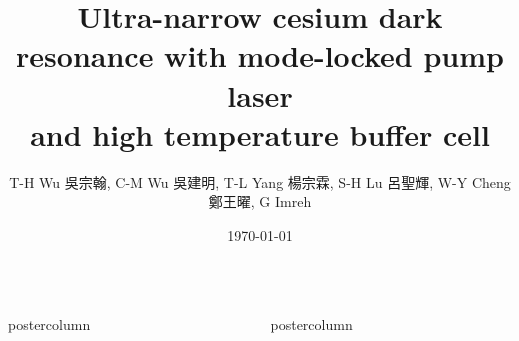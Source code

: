 \documentclass[final,CJKutf8,hyperref={pdfpagelabels=false,unicode}]{beamer}
\title{\huge Ultra-narrow cesium dark resonance with mode-locked pump laser\\ and high temperature buffer cell}
\author{\begin{TChinese}T-H Wu 吳宗翰, C-M Wu 吳建明, T-L Yang 楊宗霖, S-H Lu 呂聖輝, W-Y Cheng 鄭王曜, G Imreh\end{TChinese}}
\institute[IAMS, Academia Sinica]{Institute of Atomic and Molecular Sciences, Academia Sinica, Taiwan}
\date{\today}
\newlength{\columnheight}
\begin{document}
\begin{frame}

  \begin{columns}
    \begin{column}{.49\textwidth}
      \begin{beamercolorbox}[center,wd=\textwidth]{postercolumn}
        \begin{minipage}[T]{.95\textwidth}
          \parbox[t][\columnheight]{\textwidth}{

            


            \vfill
            

            \vfill
            

          }
        \end{minipage}
      \end{beamercolorbox}
    \end{column}
    \begin{column}{.49\textwidth}
      \begin{beamercolorbox}[center,wd=\textwidth]{postercolumn}
        \begin{minipage}[T]{.95\textwidth}
          \parbox[t][\columnheight]{\textwidth}{

            

            \vfill
            

            \vfill
            
          }
        \end{minipage}
      \end{beamercolorbox}
    \end{column}
  \end{columns}
\end{frame}
\end{document}
